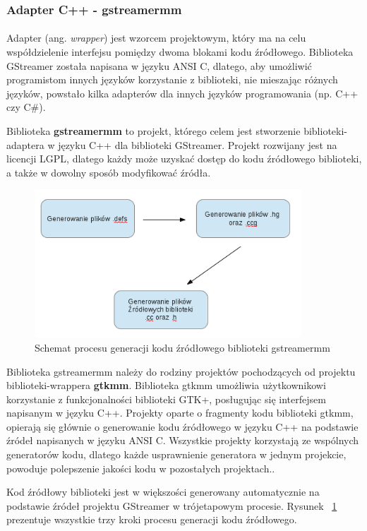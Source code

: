 \documentclass[12pt]{article}
\begin{document}
\subsubsection{Adapter C++ - gstreamermm}
\paragraph{}
Adapter (ang. \textit{wrapper}) jest wzorcem projektowym, który ma na celu współdzielenie interfejsu pomiędzy dwoma blokami kodu źródłowego. Biblioteka GStreamer została napisana w języku ANSI C, dlatego, aby umożliwić programistom innych języków korzystanie z biblioteki, nie mieszając różnych języków, powstało kilka adapterów dla innych języków programowania (np. C++ czy C\#).

Biblioteka \textbf{gstreamermm} to projekt, którego celem jest stworzenie biblioteki-adaptera w języku C++ dla biblioteki GStreamer. Projekt rozwijany jest na licencji LGPL, dlatego każdy może uzyskać dostęp do kodu źródłowego biblioteki, a także w dowolny sposób modyfikować źródła.
\begin{figure}[H]
  \includegraphics[width=100mm]{img/mm-generate-process.png}
  \caption{Schemat procesu generacji kodu źródłowego biblioteki gstreamermm}
  \label{fig:mmGenerateProcess}
\end{figure}
Biblioteka gstreamermm należy do rodziny projektów pochodzących od projektu biblioteki-wrappera \textbf{gtkmm}. Biblioteka gtkmm umożliwia użytkownikowi korzystanie z funkcjonalności biblioteki GTK+, posługując się interfejsem napisanym w języku C++. Projekty oparte o fragmenty kodu biblioteki gtkmm, opierają się głównie o generowanie kodu źródłowego w języku C++ na podstawie źródeł napisanych w języku ANSI C. Wszystkie projekty korzystają ze wspólnych generatorów kodu, dlatego każde usprawnienie generatora w jednym projekcie, powoduje polepszenie jakości kodu w pozostałych projektach..

Kod źródłowy biblioteki jest w większości generowany automatycznie na podstawie źródeł projektu GStreamer w trójetapowym procesie. Rysunek ~\ref{fig:mmGenerateProcess} prezentuje wszystkie trzy kroki procesu generacji kodu źródłowego.
\end{document}
